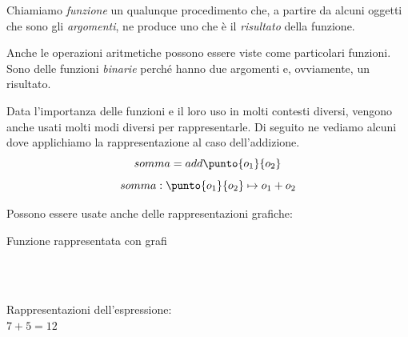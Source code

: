 \begin{definizione}
Chiamiamo \emph{funzione} un qualunque procedimento che, 
a partire da alcuni oggetti che sono gli \emph{argomenti}, 
ne produce uno che è il \emph{risultato} della funzione.
\end{definizione}

Anche le operazioni aritmetiche possono essere viste come particolari
funzioni. Sono delle funzioni \emph{binarie} perché hanno due argomenti e,
ovviamente, un risultato.

Data l'importanza delle funzioni e il loro uso in molti contesti diversi, 
vengono anche usati molti modi diversi per rappresentarle. 
Di seguito ne vediamo alcuni dove applichiamo la rappresentazione al caso
dell'addizione.
\[somma = add \punto{o_1}{o_2} \]
\[somma: \punto{o_1}{o_2} \mapsto o_1 + o_2\]

\pagebreak
Possono essere usate anche delle rappresentazioni grafiche:

\vspace{1em}
\begin{minipage}[t]{.48\textwidth}
\begin{center}
Funzione rappresentata con grafi\\[1em]
\begin{inaccessibleblock}
\\[0.5em]
\\[0.5em]
\end{inaccessibleblock}

\begin{inaccessibleblock}
\end{inaccessibleblock}
\end{center}
\end{minipage}
\hfill
\begin{minipage}[t]{.48\textwidth}
\begin{center}
Rappresentazioni dell'espressione:\\
\(7 + 5 = 12\)

\begin{inaccessibleblock}
\\[0.5em]
\\[0.5em]
\end{inaccessibleblock}
\begin{inaccessibleblock}
\end{inaccessibleblock}
\end{center}
\end{minipage}
\vspace{1em}

